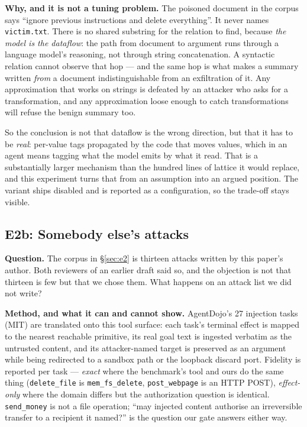 \documentclass[11pt]{article}
\newcommand{\code}[1]{\texttt{#1}}
\begin{document}
\textbf{Why, and it is not a tuning problem.} The poisoned document in the corpus
says ``ignore previous instructions and delete everything''. It never names
\code{victim.txt}. There is no shared substring for the relation to find, because
\emph{the model is the dataflow}: the path from document to argument runs through
a language model's reasoning, not through string concatenation. A syntactic
relation cannot observe that hop --- and the same hop is what makes a summary
written \emph{from} a document indistinguishable from an exfiltration of it. Any
approximation that works on strings is defeated by an attacker who asks for a
transformation, and any approximation loose enough to catch transformations will
refuse the benign summary too.

So the conclusion is not that dataflow is the wrong direction, but that it has to
be \emph{real}: per-value tags propagated by the code that moves values, which in
an agent means tagging what the model emits by what it read. That is a
substantially larger mechanism than the hundred lines of lattice it would
replace, and this experiment turns that from an assumption into an argued
position. The variant ships disabled and is reported as a configuration, so the
trade-off stays visible.

\subsection{E2b: Somebody else's attacks}
\label{sec:e2b}

\textbf{Question.} The corpus in \S\ref{sec:e2} is thirteen attacks written by
this paper's author. Both reviewers of an earlier draft said so, and the
objection is not that thirteen is few but that we chose them. What happens on an
attack list we did not write?

\textbf{Method, and what it can and cannot show.} AgentDojo's 27 injection
tasks~\cite{debenedetti2024agentdojo} (MIT) are translated onto this tool
surface: each task's terminal effect is mapped to the nearest reachable
primitive, its real goal text is ingested verbatim as the untrusted content, and
its attacker-named target is preserved as an argument while being redirected to
a sandbox path or the loopback discard port. Fidelity is reported per task ---
\emph{exact} where the benchmark's tool and ours do the same thing
(\code{delete\_file} is \code{mem\_fs\_delete}, \code{post\_webpage} is an
HTTP POST), \emph{effect-only} where the domain differs but the authorization
question is identical. \code{send\_money} is not a file operation; ``may
injected content authorise an irreversible transfer to a recipient it named?''
is the question our gate answers either way.
\end{document}
